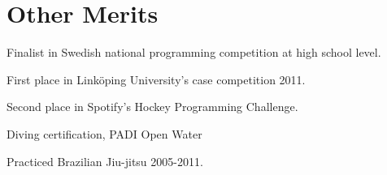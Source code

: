 \documentclass[a4paper,10pt]{article} %
\begin{document}

\section{Other Merits}

\begin{itemize}[noitemsep,topsep=0pt,parsep=0pt,partopsep=0pt]
\small{
\item Finalist in Swedish national programming competition at high school level.
\item First place in Linköping University’s case competition 2011.
\item Second place in Spotify’s Hockey Programming Challenge.
\item Diving certification, PADI Open Water
\item Practiced Brazilian Jiu-jitsu 2005-2011.}
\end{itemize}
\end{document}
